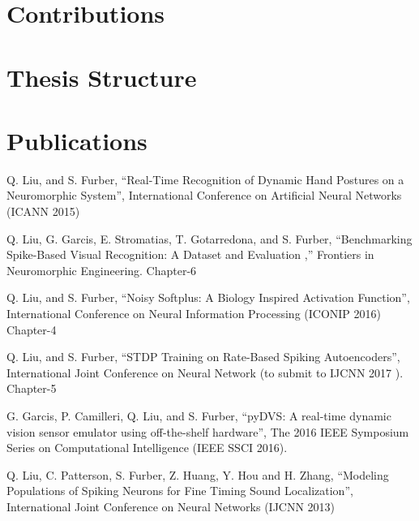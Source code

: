 \section{Contributions}
\section{Thesis Structure}
\section{Publications}
Q. Liu, and S. Furber, “Real-Time Recognition of Dynamic Hand Postures on a Neuromorphic System”, International Conference on Artificial Neural Networks (ICANN 2015)

Q. Liu, G. Garcis, E. Stromatias, T. Gotarredona, and S. Furber, “Benchmarking Spike-Based Visual Recognition: A Dataset and Evaluation ,” Frontiers in Neuromorphic Engineering. Chapter-6

Q. Liu, and S. Furber, “Noisy Softplus: A Biology Inspired Activation Function”, International Conference on Neural Information Processing (ICONIP 2016) Chapter-4

Q. Liu, and S. Furber, “STDP Training on Rate-Based Spiking Autoencoders”, International Joint Conference on Neural Network (to submit to IJCNN 2017 ). Chapter-5

G. Garcis, P. Camilleri, Q. Liu, and S. Furber, “pyDVS: A real-time dynamic vision sensor emulator using off-the-shelf hardware”, The 2016 IEEE Symposium Series on Computational Intelligence (IEEE SSCI 2016).

Q. Liu, C. Patterson, S. Furber, Z. Huang, Y. Hou and H. Zhang, “Modeling Populations of Spiking Neurons for Fine Timing Sound Localization”, International Joint Conference on Neural Networks (IJCNN 2013)